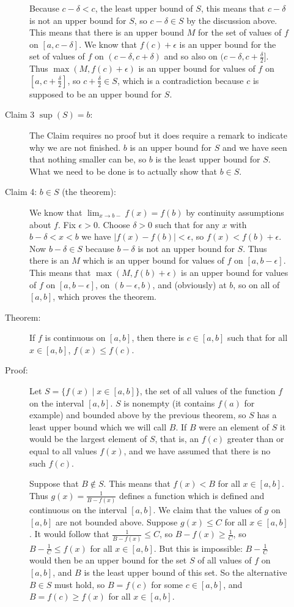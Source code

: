 \documentclass[12pt]{article}
\begin{document}
\begin{description}
\begin{description}
Because $c-\delta<c$, the least upper bound of $S$, this means that $c-\delta$ is not an upper bound for $S$, so $c-\delta \in S$ by the discussion above.  This means that there is an upper bound $M$ for the set of values of $f$ on $[a,c-\delta]$.  We know that
$f(c)+\epsilon$ is an upper bound for the set of values of $f$ on $(c-\delta,c+\delta)$ and so also on $(c-\delta,c+\frac{\delta}2]$.
Thus $\max(M,f(c)+\epsilon)$ is an upper bound for values of $f$ on $[a,c+\frac{\delta}2]$, so $c+\frac{\delta}2\in S$, which is a contradiction because $c$ is supposed to be an upper bound for $S$.

\item[Claim 3  $\sup(S)=b$:]  The Claim requires no proof but it does require a remark to indicate why we are not finished.
$b$ is an upper bound for $S$ and we have seen that nothing smaller can be, so $b$ is the least upper bound for $S$.
What we need to be done is to actually show that $b \in S$.

\item[Claim 4:  $b \in S$  (the theorem):]  
We know that $\lim_{x \rightarrow b-}f(x)=f(b)$ by continuity assumptions about $f$.  Fix $\epsilon>0$.  Choose $\delta>0$
such that for any $x$ with $b-\delta<x<b$ we have $|f(x)-f(b)|<\epsilon$, so $f(x)<f(b)+\epsilon$.  Now $b-\delta\in S$
because $b-\delta$ is not an upper bound for $S$.  Thus there is an $M$ which is an upper bound for values of $f$ on $[a,b-\epsilon]$.
This means that $\max(M,f(b)+\epsilon)$ is an upper bound for values of $f$ on $[a,b-\epsilon]$, on $(b-\epsilon,b)$, and (obviously) at $b$, so on all of $[a,b]$, which proves the theorem.

\item[Theorem:]  If $f$ is continuous on $[a,b]$, then there is $c \in [a,b]$ such that for all $x \in [a,b]$, $f(x)\leq f(c)$.

\item[Proof:] 

Let $S = \{f(x) \mid x \in [a,b]\}$, the set of all values of the function $f$ on the interval $[a,b]$.  $S$ is nonempty (it contains $f(a)$
for example) and bounded above by the previous theorem, so $S$ has a least upper bound which we will call $B$.  If $B$ were an element of $S$ it would be the largest element of $S$, that is, an $f(c)$ greater than or equal to all values $f(x)$, and we have assumed that there is no such $f(c)$.

Suppose that $B \not\in S$.  This means that $f(x)<B$ for all $x \in [a,b]$.  Thus $g(x)=\frac1{B-f(x)}$ defines a function which is defined and continuous on the interval $[a,b]$.  We claim that the values of $g$ on $[a,b]$ are not bounded above.  Suppose $g(x)\leq C$ for
all $x \in [a,b]$.  It would follow that $\frac1{B-f(x)}\leq C$, so $B-f(x) \geq \frac1C$, so $B-\frac1C \leq f(x)$ for all $x \in [a,b]$.
But this is impossible:  $B-\frac1C$ would then be an upper bound for the set $S$ of all values of $f$ on $[a,b]$, and $B$ is the least upper bound of this set.  So the alternative $B \in S$ must hold, so $B=f(c)$ for some $c \in [a,b]$, and $B = f(c) \geq f(x)$ for all $x \in [a,b]$.


\end{description}
\end{description}
\end{document}
